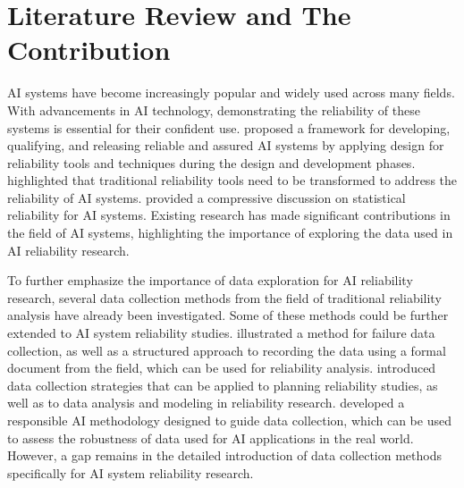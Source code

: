 \section{Literature Review and The Contribution}

AI systems have become increasingly popular and widely used across many fields. With advancements in AI technology, demonstrating the reliability of these systems is essential for their confident use.  proposed a framework for developing, qualifying, and releasing reliable and assured AI systems by applying design for reliability tools and techniques during the design and development phases.  highlighted that traditional reliability tools need to be transformed to address the reliability of AI systems.  provided a compressive discussion on statistical reliability for AI systems. Existing research has made significant contributions in the field of AI systems, highlighting the importance of exploring the data used in AI reliability research.


To further emphasize the importance of data exploration for AI reliability research, several data collection methods from the field of traditional reliability analysis have already been investigated. Some of these methods could be further extended to AI system reliability studies.  illustrated a method for failure data collection, as well as a structured approach to recording the data using a formal document from the field, which can be used for reliability analysis.  introduced data collection strategies that can be applied to planning reliability studies, as well as to data analysis and modeling in reliability research.  developed a responsible AI methodology designed to guide data collection, which can be used to assess the robustness of data used for AI applications in the real world. However, a gap remains in the detailed introduction of data collection methods specifically for AI system reliability research.


